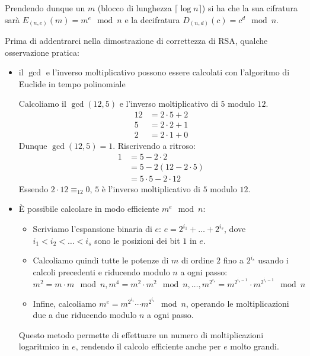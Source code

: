 Prendendo dunque un \(m\) (blocco di lunghezza \(\lceil \log n \rceil\)) si ha che la sua cifratura sarà \(E_{(n,e)} (m) = m^e \mod n\) e la decifratura \(D_{(n,d)} (c) = c^d \mod n\).

Prima di addentrarci nella dimostrazione di correttezza di RSA, qualche osservazione pratica:
\begin{itemize}
  \item il \(\gcd\) e l'inverso moltiplicativo possono essere calcolati con l'algoritmo di Euclide in tempo polinomiale
  \begin{example}{}
    Calcoliamo il \(\gcd(12,5)\) e l'inverso moltiplicativo di \(5\) modulo \(12\).
    \[\begin{aligned}
      12 &= 2\cdot 5 + 2\\
      5 &= 2\cdot 2 + 1\\
      2 &= 2\cdot 1 + 0
    \end{aligned}\]
    Dunque \(\gcd(12,5) = 1\).
    Riscrivendo a ritroso:
    \[\begin{aligned}
      1 &= 5 - 2\cdot 2\\
      &= 5 - 2(12 - 2\cdot 5)\\
      &= 5\cdot 5 - 2\cdot 12
    \end{aligned}\]
    Essendo \(2\cdot 12 \equiv_{12} 0\), \(5\) è l'inverso moltiplicativo di \(5\) modulo \(12\).
  \end{example}
  \item È possibile calcolare in modo efficiente \(m^e \mod n\):
    \begin{itemize}
      \item Scriviamo l'espansione binaria di \(e\): \(e = 2^{i_1} + \ldots + 2^{i_s}\), dove \(i_1 < i_2 < \ldots < i_s\) sono le posizioni dei bit \(1\) in \(e\).
      \item Calcoliamo quindi tutte le potenze di \(m\) di ordine \(2\) fino a \(2^{i_s}\) usando i calcoli precedenti e riducendo modulo \(n\) a ogni passo:
        \[m^2 = m\cdot m \mod n, m^4 = m^2 \cdot m^2 \mod n, \ldots, m^{2^{i_s}} = m^{2^{i_s-1}} \cdot m^{2^{i_s-1}} \mod n\]
      \item Infine, calcoliamo \(m^e = m^{2^{i_1}} \cdots m^{2^{i_s}} \mod n\), operando le moltiplicazioni due a due riducendo modulo \(n\) a ogni passo.
    \end{itemize}
    Questo metodo permette di effettuare un numero di moltiplicazioni logaritmico in \(e\), rendendo il calcolo efficiente anche per \(e\) molto grandi.
\end{itemize}

